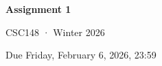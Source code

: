 \documentclass{course}
\begin{document}
\begin{center}
{\LARGE\bfseries Assignment 1\par}\vspace{2mm}
{CSC148 · Winter 2026\par}
{Due Friday, February 6, 2026, 23:59\par}
\end{center}
\vspace{4mm}
\end{document}

